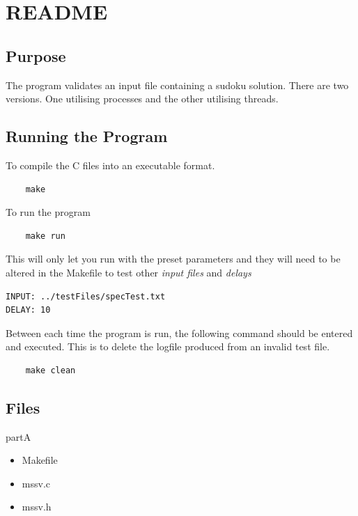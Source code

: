 \documentclass[]{article}
\begin{document}
\section{README}



\subsection{Purpose}
The program validates an input file containing a sudoku solution. There are two versions. One utilising processes and the other utilising threads.

\subsection{Running the Program}
To compile the C files into an executable format.

\begin{lstlisting}
	make
\end{lstlisting}

To run the program \\


\begin{lstlisting}
	make run 
\end{lstlisting}

This will only let you run with the preset parameters and they will need to be altered in the Makefile to test other \textit{input files} and \textit{delays} \\


\begin{lstlisting}
INPUT: ../testFiles/specTest.txt
DELAY: 10
\end{lstlisting}

Between each time the program is run, the following command should be entered and executed. This is to delete the logfile produced from an invalid test file.

\begin{lstlisting}
	make clean
\end{lstlisting}

\subsection{Files}
partA
\begin{itemize}
	\item Makefile
	\item mssv.c
	\item mssv.h
\end{itemize}
\end{document}

